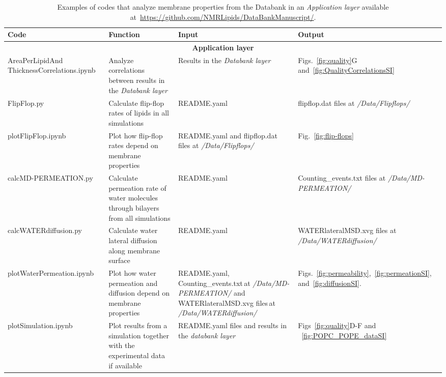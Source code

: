 \documentclass[fleqn,10pt]{wlscirepSI}
\begin{document}
\begin{table}[!h]
    \centering
    \begin{tabular}{p{3.5cm}  p{4.5cm}  p{3.0cm}  p{4.0cm}}
        Code & Function & Input & Output \\
        \hline
        \multicolumn{4}{c}{ {\bf Application layer}}\\
        \hline
        AreaPerLipidAnd ThicknessCorrelations.ipynb  & Analyze correlations between results in the {\it Databank layer}  & Results in the {\it Databank layer} & Figs.~\ref{fig:quality}G and~\ref{fig:QualityCorrelationsSI} \\
        FlipFlop.py & Calculate flip-flop rates of lipids in all simulations & README.yaml & flipflop.dat files at {\it /Data/Flipflops/} \\
        plotFlipFlop.ipynb & Plot how flip-flop rates depend on membrane properties & README.yaml and flipflop.dat files at {\it /Data/Flipflops/} & Fig.~\ref{fig:flip-flops} \\
        calcMD-PERMEATION.py  & Calculate permeation rate of water molecules through bilayers from all simulations & README.yaml & Counting\_events.txt files at {\it /Data/MD-PERMEATION/} \\
        calcWATERdiffusion.py & Calculate water lateral diffusion along membrane surface & README.yaml & WATERlateralMSD.xvg files at {\it /Data/WATERdiffusion/} \\
        plotWaterPermeation.ipynb & Plot how water permeation and diffusion depend on membrane properties & README.yaml, Counting\_events.txt\,at {\it /Data/MD-PERMEATION/} and\,WATERlateralMSD.xvg files\,at {\it /Data/WATERdiffusion/} & Figs.~\ref{fig:permeability},~\ref{fig:permeationSI}, and~\ref{fig:diffusionSI}. \\
        plotSimulation.ipynb & Plot results from a simulation together with the experimental data if available & README.yaml files and results in the {\it databank layer} & Figs~\ref{fig:quality}D-F and ~\ref{fig:POPC_POPE_dataSI}
    \end{tabular}
    \caption{Examples of codes that analyze membrane properties from the Databank in an {\it Application layer} available at~\url{https://github.com/NMRLipids/DataBankManuscript/}.}
    \label{tab:codesApplication}
\end{table}
\end{document}
